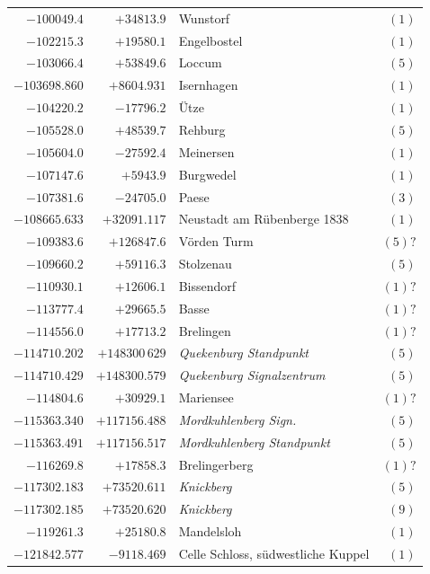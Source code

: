 \begin{center}
\begin{tabular}{r|r|p{170pt}|r}
\(-100049.4\)&\(+34813.9\)&Wunstorf&\((1)\)\\
\(-102215.3\)&\(+19580.1\)&Engelbostel&\((1)\)\\
\(-103066.4\)&\(+53849.6\)&Loccum&\((5)\)\\
\(-103698.860\)&\(+8604.931\)&Isernhagen&\((1)\)\\
\(-104220.2\)&\(-17796.2\)&Ütze&\((1)\)\\
\(-105528.0\)&\(+48539.7\)&Rehburg&\((5)\)\\
\(-105604.0\)&\(-27592.4\)&Meinersen&\((1)\)\\
\(-107147.6\)&\(+5943.9\)&Burgwedel&\((1)\)\\
\(-107381.6\)&\(-24705.0\)&Paese&\((3)\)\\
\(-108665.633\)&\(+32091.117\)&Neustadt am Rübenberge 1838&\((1)\)\\
\(-109383.6\)&\(+126847.6\)&Vörden Turm&\((5)?\)\\
\(-109660.2\)&\(+59116.3\)&Stolzenau&\((5)\)\\
\(-110930.1\)&\(+12606.1\)&Bissendorf&\((1)?\)\\
\(-113777.4\)&\(+29665.5\)&Basse&\((1)?\)\\
\(-114556.0\)&\(+17713.2\)&Brelingen&\((1)?\)\\
\(-114710.202\)&\(+148300\,629\)&\textit{Quekenburg Standpunkt}&\((5)\)\\
\(-114710.429\)&\(+148300.579\)&\textit{Quekenburg Signalzentrum}&\((5)\)\\
\(-114804.6\)&\(+30929.1\)&Mariensee&\((1)?\)\\
\(-115363.340\)&\(+117156.488\)&\textit{Mordkuhlenberg Sign.}&\((5)\)\\
\(-115363.491\)&\(+117156.517\)&\textit{Mordkuhlenberg Standpunkt}&\((5)\)\\
\(-116269.8\)&\(+17858.3\)&Brelingerberg&\((1)?\)\\
\(-117302.183\)&\(+73520.611\)&\textit{Knickberg}&\((5)\)\\
\(-117302.185\)&\(+73520.620\)&\textit{Knickberg}&\((9)\)\\
\(-119261.3\)&\(+25180.8\)&Mandelsloh&\((1)\)\\
\(-121842.577\)&\(-9118.469\)&Celle Schloss, südwestliche Kuppel&\((1)\)\\
\hline\end{tabular}\endgroup\end{center}
